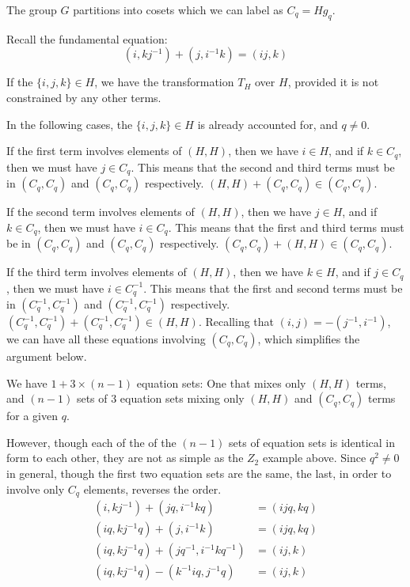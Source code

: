 \documentclass{revtex4-1}
\begin{document}
The group $G$ partitions into cosets which we can label as $C_q = H g_q$.

Recall the fundamental equation:
\begin{equation}
(i,kj^{-1})+ (j,i^{-1}k) = (ij,k)
\end{equation}

If the $\{i,j,k\} \in H$, we have the transformation $T_H$ over $H$, provided it is
not constrained by any other terms.

In the following cases, the $\{i,j,k\} \in H$ is already accounted for, and $q \ne 0$.

If the first term involves elements of $(H,H)$, then we have $i \in H$, and if $k \in C_q$, then
we must have $j \in C_q$.  This means that the second and third terms must be in $(C_q,C_q)$
and $(C_q,C_q)$ respectively.  $(H,H) + (C_q,C_q) \in (C_q,C_q)$.

If the second term involves elements of $(H,H)$, then we have $j \in H$, and if $k \in C_q$, then
we must have $i \in C_q$.  This means that the first and third terms must be in $(C_q,C_q)$ and
$(C_q,C_q)$ respectively.   $(C_q,C_q) + (H,H)  \in (C_q,C_q)$.

If the third term involves elements of $(H,H)$, then we have $k \in H$, and if $j \in C_q$, then
we must have $i \in C_q^{-1}$. This means that the first and second terms must be in $(C_q^{-1},C_q^{-1})$
and $(C_q^{-1},C_q^{-1})$ respectively.  $(C_q^{-1},C_q^{-1}) + (C_q^{-1},C_q^{-1}) \in (H,H)$.
Recalling that $(i,j) = -(j^{-1},i^{-1})$, we can have all these equations involving $(C_q,C_q)$, which
simplifies the argument below.

We have $1+3 \times (n-1)$ equation sets:  One that mixes only $(H,H)$ terms, and $(n-1)$ sets of $3$
equation sets mixing only $(H,H)$ and $(C_q,C_q)$ terms for a given $q$.  

\par However, though each of the of the $(n-1)$ sets of
equation sets is identical in form to each other, they are not as simple as the $Z_2$ example above.
Since $q^2 \neq 0$ in general, though the first two equation sets are the same, the last, in order to
involve only $C_q$ elements, reverses the order.
\begin{align}
 (i,kj^{-1}) + (jq,i^{-1}kq) & = (ijq,kq) \\ 
(iq,kj^{-1}q) + (j,i^{-1}k) &= (ijq,kq) \\ 
(iq,kj^{-1}q) + (jq^{-1},i^{-1}kq^{-1}) &= (ij,k) \nonumber \\ 
(iq,kj^{-1}q) - (k^{-1}iq,j^{-1}q) &= (ij,k) 
\end{align}
\end{document}
